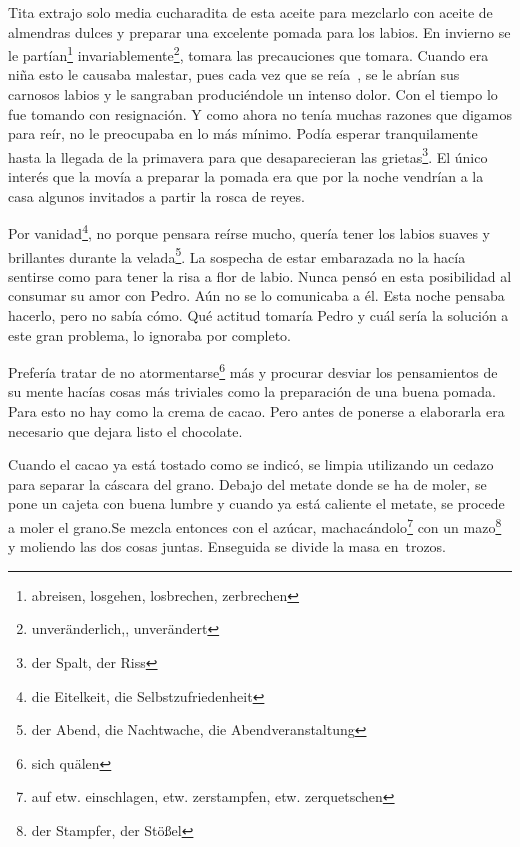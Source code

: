 Tita extrajo solo media cucharadita de esta aceite para mezclarlo con
aceite de almendras dulces y preparar una excelente pomada para los
labios. En invierno se le partían\footnote{abreisen, losgehen, losbrechen, zerbrechen} invariablemente\footnote{unveränderlich,, unverändert},
tomara las precauciones que tomara. Cuando era niña esto le causaba malestar, pues
cada vez que se reía~, se le abrían sus carnosos labios y le
sangraban produciéndole un intenso dolor. Con el tiempo lo fue tomando
con resignación. Y como ahora no tenía muchas razones que digamos para
reír, no le preocupaba en lo más mínimo. Podía esperar tranquilamente
hasta la llegada de la primavera para que desaparecieran las grietas\footnote{der Spalt, der Riss}.
El único interés que la movía a preparar la pomada era que por la noche
vendrían a la casa algunos invitados a partir la rosca de reyes.

Por vanidad\footnote{die Eitelkeit, die Selbstzufriedenheit},
no porque pensara reírse mucho, quería tener los labios
suaves y brillantes durante la velada\footnote{der Abend, die Nachtwache, die Abendveranstaltung}.
La sospecha de estar embarazada no la hacía sentirse como para tener
la risa a flor de labio. Nunca pensó en esta posibilidad al consumar
su amor con Pedro. Aún no se lo comunicaba a él. Esta noche pensaba hacerlo,
pero no sabía cómo. Qué actitud tomaría Pedro y cuál sería la solución
a este gran problema, lo ignoraba por completo.

Prefería tratar de no atormentarse\footnote{sich quälen} más
y procurar desviar los pensamientos de su mente hacías cosas más triviales
como la preparación de una buena pomada. Para esto no hay como la crema
de cacao. Pero antes de ponerse a elaborarla era necesario que dejara
listo el chocolate.

Cuando el cacao ya está tostado como se indicó, se limpia utilizando un
cedazo para separar la cáscara del grano. Debajo del metate donde se ha
de moler, se pone un cajeta con buena lumbre y cuando ya está caliente
el metate, se procede a moler el grano.Se mezcla entonces con el azúcar, machacándolo\footnote{auf etw. einschlagen, etw. zerstampfen, etw. zerquetschen}
con un mazo\footnote{der Stampfer, der Stößel} y moliendo las dos
cosas juntas. Enseguida se divide la masa en~trozos.

